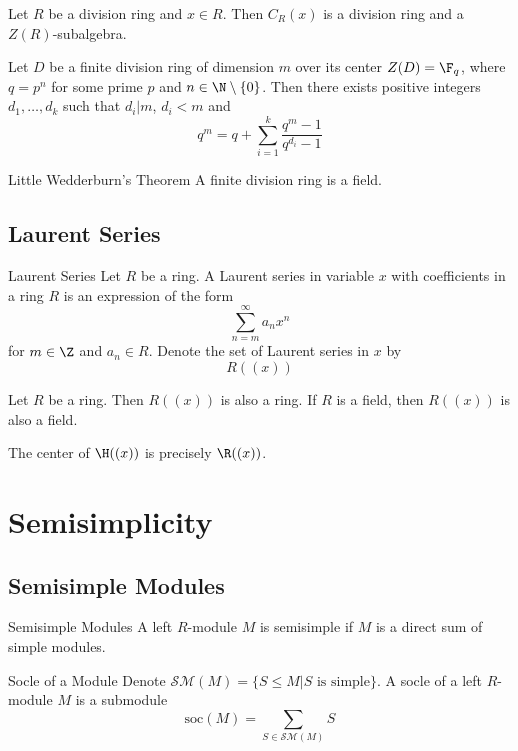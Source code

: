 \documentclass[a4paper]{article}
\begin{document}
\begin{lmm}{}{} Let $R$ be a division ring and $x\in R$. Then $C_R(x)$ is a division ring and a $Z(R)$-subalgebra. 
\end{lmm}

\begin{prp}{}{} Let $D$ be a finite division ring of dimension $m$ over its center $Z(D)=\F_q$, where $q=p^n$ for some prime $p$ and $n\in\N\setminus\{0\}$. Then there exists positive integers $d_1,\dots,d_k$ such that $d_i|m$, $d_i<m$ and $$q^m=q+\sum_{i=1}^k\frac{q^m-1}{q^{d_i}-1}$$
\end{prp}

\begin{thm}{Little Wedderburn's Theorem}{} A finite division ring is a field. 
\end{thm}

\subsection{Laurent Series}
\begin{defn}{Laurent Series}{} Let $R$ be a ring. A Laurent series in variable $x$ with coefficients in a ring $R$ is an expression of the form $$\sum_{n=m}^\infty a_nx^n$$ for $m\in\Z$ and $a_n\in R$. Denote the set of Laurent series in $x$ by $$R((x))$$
\end{defn}

\begin{lmm}{}{} Let $R$ be a ring. Then $R((x))$ is also a ring. If $R$ is a field, then $R((x))$ is also a field. 
\end{lmm}

\begin{lmm}{}{} The center of $\H((x))$ is precisely $\R((x))$. 
\end{lmm}

\pagebreak
\section{Semisimplicity}
\subsection{Semisimple Modules}
\begin{defn}{Semisimple Modules}{} A left $R$-module $M$ is semisimple if $M$ is a direct sum of simple modules. 
\end{defn}

\begin{defn}{Socle of a Module}{} Denote $\mathcal{SM}(M)=\{S\leq M|S\text{ is simple}\}$. A socle of a left $R$-module $M$ is a submodule $$\text{soc}(M)=\sum_{S\in\mathcal{SM}(M)}S$$
\end{defn}
\end{document}
